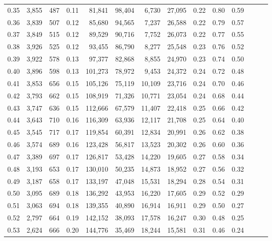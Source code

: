 \begin{tabular}{rrrrrrrrrrrrrr}
0.35 &  3,855 &  487 &  0.11 &   81,841 &   98,404 &   6,730 &  27,095 &  0.22 &  0.80 &      0.59 \\
0.36 &  3,839 &  507 &  0.12 &   85,680 &   94,565 &   7,237 &  26,588 &  0.22 &  0.79 &      0.57 \\
0.37 &  3,849 &  515 &  0.12 &   89,529 &   90,716 &   7,752 &  26,073 &  0.22 &  0.77 &      0.55 \\
0.38 &  3,926 &  525 &  0.12 &   93,455 &   86,790 &   8,277 &  25,548 &  0.23 &  0.76 &      0.52 \\
0.39 &  3,922 &  578 &  0.13 &   97,377 &   82,868 &   8,855 &  24,970 &  0.23 &  0.74 &      0.50 \\
0.40 &  3,896 &  598 &  0.13 &  101,273 &   78,972 &   9,453 &  24,372 &  0.24 &  0.72 &      0.48 \\
0.41 &  3,853 &  656 &  0.15 &  105,126 &   75,119 &  10,109 &  23,716 &  0.24 &  0.70 &      0.46 \\
0.42 &  3,793 &  662 &  0.15 &  108,919 &   71,326 &  10,771 &  23,054 &  0.24 &  0.68 &      0.44 \\
0.43 &  3,747 &  636 &  0.15 &  112,666 &   67,579 &  11,407 &  22,418 &  0.25 &  0.66 &      0.42 \\
0.44 &  3,643 &  710 &  0.16 &  116,309 &   63,936 &  12,117 &  21,708 &  0.25 &  0.64 &      0.40 \\
0.45 &  3,545 &  717 &  0.17 &  119,854 &   60,391 &  12,834 &  20,991 &  0.26 &  0.62 &      0.38 \\
0.46 &  3,574 &  689 &  0.16 &  123,428 &   56,817 &  13,523 &  20,302 &  0.26 &  0.60 &      0.36 \\
0.47 &  3,389 &  697 &  0.17 &  126,817 &   53,428 &  14,220 &  19,605 &  0.27 &  0.58 &      0.34 \\
0.48 &  3,193 &  653 &  0.17 &  130,010 &   50,235 &  14,873 &  18,952 &  0.27 &  0.56 &      0.32 \\
0.49 &  3,187 &  658 &  0.17 &  133,197 &   47,048 &  15,531 &  18,294 &  0.28 &  0.54 &      0.31 \\
0.50 &  3,095 &  689 &  0.18 &  136,292 &   43,953 &  16,220 &  17,605 &  0.29 &  0.52 &      0.29 \\
0.51 &  3,063 &  694 &  0.18 &  139,355 &   40,890 &  16,914 &  16,911 &  0.29 &  0.50 &      0.27 \\
0.52 &  2,797 &  664 &  0.19 &  142,152 &   38,093 &  17,578 &  16,247 &  0.30 &  0.48 &      0.25 \\
0.53 &  2,624 &  666 &  0.20 &  144,776 &   35,469 &  18,244 &  15,581 &  0.31 &  0.46 &      0.24 \\

\end{tabular}
